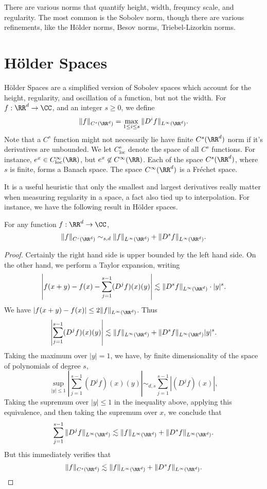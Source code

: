 %
There are various norms that quantify height, width, frequncy scale, and regularity. The most common is the Sobolev norm, though there are various refinements, like the H\"{o}lder norms, Besov norms, Triebel-Lizorkin norms.

\section{H\"{o}lder Spaces}

H\"{o}lder Spaces are a simplified version of Sobolev spaces which account for the height, regularity, and oscillation of a function, but not the width. For $f: \RR^d \to \CC$, and an integer $s \geq 0$, we define
%
\[ \| f \|_{C^s(\RR^d)} = \max_{1 \leq i \leq s} \| D^i f \|_{L^\infty(\RR^d)}. \]
%
Note that a $C^s$ function might not necessarily lie have finite $C^s(\RR^d)$ norm if it's derivatives are unbounded. We let $C^s_{\text{loc}}$ denote the space of all $C^s$ functions. For instance, $e^x \in C^\infty_\text{loc}(\RR)$, but $e^x \not \in C^\infty(\RR)$. Each of the space $C^s(\RR^d)$, where $s$ is finite, forms a Banach space. The space $C^\infty(\RR^d)$ is a Fr\'{e}chet space.

It is a useful heuristic that only the smallest and largest derivatives really matter when measuring regularity in a space, a fact also tied up to interpolation. For instance, we have the following result in H\"{o}lder spaces.

\begin{theorem}
    For any function $f: \RR^d \to \CC$,
    \[ \| f \|_{C^s(\RR^d)} \sim_{s,d} \| f \|_{L^\infty(\RR^d)} + \| D^s f \|_{L^\infty(\RR^d)}. \]
\end{theorem}
\begin{proof}
    Certainly the right hand side is upper bounded by the left hand side. On the other hand, we perform a Taylor expansion, writing
    \[ \left| f(x+y) - f(x) - \sum_{j = 1}^{s-1} (D^j f)(x)(y) \right| \lesssim \| D^s f \|_{L^\infty(\RR^d)} \cdot |y|^s. \]
    We have $|f(x+y) - f(x)| \leq 2 \| f \|_{L^\infty(\RR^d)}$. Thus
    \[ \left| \sum_{j = 1}^{s-1} (D^j f)(x)(y) \right| \lesssim \| f \|_{L^\infty(\RR^d)} + \| D^s f \|_{L^\infty(\RR^d)} |y|^s. \]
    Taking the maximum over $|y| = 1$, we have, by finite dimensionality of the space of polynomials of degree $s$,
    \[ \sup_{|y| \leq 1} \left| \sum_{j = 1}^{s-1} (D^j f)(x)(y) \right| \sim_{d,s} \sum_{j = 1}^{s-1} |(D^j f)(x)|, \]
    Taking the supremum over $|y| \leq 1$ in the inequality above, applying this equivalence, and then taking the supremum over $x$, we conclude that
    \[ \sum_{j = 1}^{s-1} \| D^j f \|_{L^\infty(\RR^d)} \lesssim \| f \|_{L^\infty(\RR^d)} + \| D^s f \|_{L^\infty(\RR^d)}. \]
    But this immediately verifies that
    \[ \| f \|_{C^s(\RR^d)} \lesssim \| f \|_{L^\infty(\RR^d)} + \| D^s f \|_{L^\infty(\RR^d)}. \qedhere \]
\end{proof}

